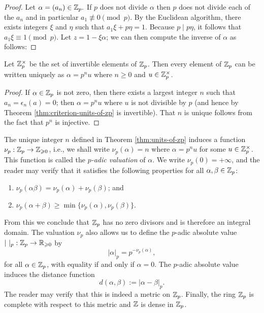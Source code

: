 \begin{proof}
    Let \(\alpha = (a_n) \in \mathbb{Z}_p.\) If \(p\) does not divide \(\alpha\) then \(p\) does not divide each of the \(a_n\) and in particular \(a_1 \not\equiv 0 \pmod{p}\). By the Euclidean algorithm, there exists integers \(\xi\) and \(\eta\) such that \(a_1\xi + p\eta = 1\). Because \(p \mid p\eta\), it follows that \(a_1\xi \equiv 1 \pmod{p}\). Let \(z = 1 - \xi\alpha\); we can then compute the inverse of \(\alpha\) as follows:
\end{proof}

\begin{theoremx}\label{thm:units-of-zp}
    Let \(\mathbb{Z}_p^{\times}\) be the set of invertible elements of \(\mathbb{Z}_p\). Then every element of \(\mathbb{Z}_p\) can be written uniquely as \(\alpha = p^nu\) where \(n \geq 0\) and \(u \in \mathbb{Z}_p^{\times}\).
\end{theoremx}

\begin{proof}
    If \(\alpha \in \mathbb{Z}_p\) is not zero, then there exists a largest integer \(n\) such that \(a_n = \epsilon_n(a) = 0\); then \(\alpha = p^nu\) where \(u\) is not divisible by \(p\) (and hence by Theorem \ref{thm:criterion-units-of-zp} is invertible). That \(n\) is unique follows from the fact that \(p^n\) is injective.
\end{proof}

\smallskip

The unique integer \(n\) defined in Theorem \ref{thm:units-of-zp} induces a function \(\nu_p : \mathbb{Z}_p \to \mathbb{Z}_{\geqslant 0}\), i.e., we shall write \(\nu_p(\alpha) = n\) where \(\alpha = p^nu\) for some \(u \in \mathbb{Z}_p^{\times}\). This function is called the \emph{\(p\)-adic valuation} of \(\alpha\). We write \(\nu_p(0) = +\infty\), and the reader may verify that it satisfies the following properties for all \(\alpha, \beta \in \mathbb{Z}_p\):

\smallskip

\begin{enumerate}[nosep, label=(\roman*)]
    \item \(\nu_p(\alpha\beta) = \nu_p(\alpha) + \nu_p(\beta)\); and
    \item \(\nu_p(\alpha + \beta) \geq \min\{\nu_p(\alpha), \nu_p(\beta)\}\).
\end{enumerate}

\smallskip

\noindent From this we conclude that \(\mathbb{Z}_p\) has no zero divisors and is therefore an integral domain. The valuation \(\nu_p\) also allows us to define the \(p\)-adic absolute value \(|\ |_p : \mathbb{Z}_p \to \mathbb{R}_{\geqslant 0}\) by
\[
  |\alpha|_p = p^{-\nu_p(\alpha)},
\]
for all \(\alpha \in \mathbb{Z}_p\), with equality if and only if \(\alpha = 0\). The \(p\)-adic absolute value induces the distance function
\[
  d(\alpha, \beta) := |\alpha - \beta|_p.
\]
The reader may verify that this is indeed a metric on \(\mathbb{Z}_p\). Finally, the ring \(\mathbb{Z}_p\) is complete with respect to this metric and \(\mathbb{Z}\) is dense in \(\mathbb{Z}_p\). \cite[p.~12]{serre2012course}

